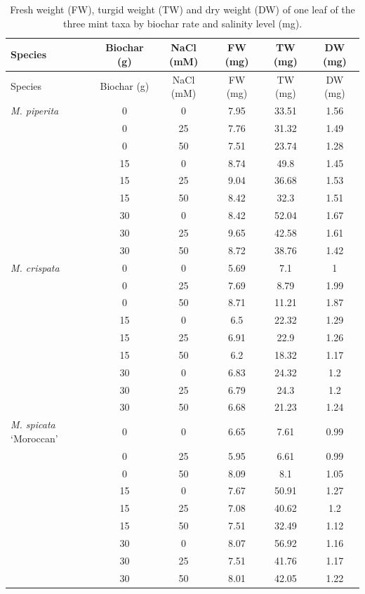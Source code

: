 {
\small
\begin{longtable}{p{3cm}cc S[table-format=2.2,round-mode=places,round-precision=2] S[table-format=3.2,round-mode=places,round-precision=2] S[table-format=1.2,round-mode=places,round-precision=2]}
  \caption[Leaf fresh, turgid and dry weight]{Fresh weight (FW), turgid weight (TW) and dry weight (DW) of one leaf of the three mint taxa by biochar rate and salinity level (mg).} \label{tab:weights} \\
  \toprule
  Species & Biochar (g) & NaCl (mM) & {FW (mg)} & {TW (mg)} & {DW (mg)} \\
  \midrule
  \endfirsthead
  \toprule
  Species & Biochar (g) & NaCl (mM) & {FW (mg)} & {TW (mg)} & {DW (mg)} \\
  \midrule
  \endhead
  \bottomrule
  \endlastfoot
  \textit{M. piperita} & 0 & 0 & 7.95 & 33.51 & 1.56 \\
   & 0 & 25 & 7.76 & 31.32 & 1.49 \\
   & 0 & 50 & 7.51 & 23.74 & 1.28 \\
   & 15 & 0 & 8.74 & 49.8 & 1.45 \\
   & 15 & 25 & 9.04 & 36.68 & 1.53 \\
   & 15 & 50 & 8.42 & 32.3 & 1.51 \\
   & 30 & 0 & 8.42 & 52.04 & 1.67 \\
   & 30 & 25 & 9.65 & 42.58 & 1.61 \\
   & 30 & 50 & 8.72 & 38.76 & 1.42 \\
  \midrule
  \textit{M. crispata} & 0 & 0 & 5.69 & 7.1 & 1 \\
   & 0 & 25 & 7.69 & 8.79 & 1.99 \\
   & 0 & 50 & 8.71 & 11.21 & 1.87 \\
   & 15 & 0 & 6.5 & 22.32 & 1.29 \\
   & 15 & 25 & 6.91 & 22.9 & 1.26 \\
   & 15 & 50 & 6.2 & 18.32 & 1.17 \\
   & 30 & 0 & 6.83 & 24.32 & 1.2 \\
   & 30 & 25 & 6.79 & 24.3 & 1.2 \\
   & 30 & 50 & 6.68 & 21.23 & 1.24 \\
  \midrule
  \textit{M. spicata} `Moroccan' & 0 & 0 & 6.65 & 7.61 & 0.99 \\
   & 0 & 25 & 5.95 & 6.61 & 0.99 \\
   & 0 & 50 & 8.09 & 8.1 & 1.05 \\
   & 15 & 0 & 7.67 & 50.91 & 1.27 \\
   & 15 & 25 & 7.08 & 40.62 & 1.2 \\
   & 15 & 50 & 7.51 & 32.49 & 1.12 \\
   & 30 & 0 & 8.07 & 56.92 & 1.16 \\
   & 30 & 25 & 7.51 & 41.76 & 1.17 \\
   & 30 & 50 & 8.01 & 42.05 & 1.22 \\
\end{longtable}
}

